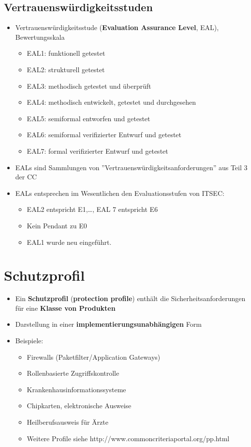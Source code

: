 \documentclass[openany]{book}
\begin{document}
\subsection{Vertrauenswürdigkeitsstuden}

\begin{itemize}
    \item Vertrauenswürdigkeitsstude (\textbf{Evaluation Assurance Level}, EAL), Bewertungsskala
    \begin{itemize}
        \item EAL1: funktionell getestet
        \item EAL2: strukturell getestet
        \item EAL3: methodisch getestet und überprüft
        \item EAL4: methodisch entwickelt, getestet und durchgesehen
        \item EAL5: semiformal entworfen und getestet
        \item EAL6: semiformal verifizierter Entwurf und getestet
        \item EAL7: formal verifizierter Entwurf und getestet
    \end{itemize}
    \item EALs sind Sammlungen von ''Vertrauenswürdigkeitsanforderungen'' aus Teil 3 der CC
    \item EALs entsprechen im Wesentlichen den Evaluationsstufen von ITSEC:
    \begin{itemize}
        \item EAL2 entspricht E1,\dots, EAL 7 entspricht E6
        \item Kein Pendant zu E0
        \item EAL1 wurde neu eingeführt. 
    \end{itemize}
\end{itemize}

\newpage

\section{Schutzprofil}

\begin{itemize}
    \item Ein \textbf{Schutzprofil} (\textbf{protection profile}) enthält die Sicherheitsanforderungen für eine \textbf{Klasse von Produkten}
    \item Darstellung in einer \textbf{implementierungsunabhängigen} Form
    \item Beispiele:
    \begin{itemize}
        \item Firewalls (Paketfilter/Application Gateways)
        \item Rollenbasierte Zugriffskontrolle
        \item Krankenhausinformationssysteme
        \item Chipkarten, elektronische Ausweise
        \item Heilberufsausweis für Ärzte
        \item Weitere Profile siehe http://www.commoncriteriaportal.org/pp.html
    \end{itemize}
\end{itemize}
\end{document}
